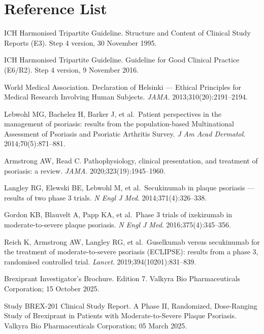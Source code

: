 \section{Reference List}

\begin{enumerate}[label={[\arabic*]}, leftmargin=*]
  \item ICH Harmonised Tripartite Guideline. Structure and Content of Clinical Study Reports (E3). Step 4 version, 30 November 1995.
  \item ICH Harmonised Tripartite Guideline. Guideline for Good Clinical Practice (E6/R2). Step 4 version, 9 November 2016.
  \item World Medical Association. Declaration of Helsinki --- Ethical Principles for Medical Research Involving Human Subjects. \textit{JAMA}. 2013;310(20):2191--2194.
  \item Lebwohl MG, Bachelez H, Barker J, et al.\ Patient perspectives in the management of psoriasis: results from the population-based Multinational Assessment of Psoriasis and Psoriatic Arthritis Survey. \textit{J Am Acad Dermatol}. 2014;70(5):871--881.
  \item Armstrong AW, Read C. Pathophysiology, clinical presentation, and treatment of psoriasis: a review. \textit{JAMA}. 2020;323(19):1945--1960.
  \item Langley RG, Elewski BE, Lebwohl M, et al.\ Secukinumab in plaque psoriasis --- results of two phase 3 trials. \textit{N Engl J Med}. 2014;371(4):326--338.
  \item Gordon KB, Blauvelt A, Papp KA, et al.\ Phase 3 trials of ixekizumab in moderate-to-severe plaque psoriasis. \textit{N Engl J Med}. 2016;375(4):345--356.
  \item Reich K, Armstrong AW, Langley RG, et al.\ Guselkumab versus secukinumab for the treatment of moderate-to-severe psoriasis (ECLIPSE): results from a phase 3, randomised controlled trial. \textit{Lancet}. 2019;394(10201):831--839.
  \item Brexiprant Investigator's Brochure. Edition 7. Valkyra Bio Pharmaceuticals Corporation; 15 October 2025.
  \item Study BREX-201 Clinical Study Report. A Phase II, Randomized, Dose-Ranging Study of Brexiprant in Patients with Moderate-to-Severe Plaque Psoriasis. Valkyra Bio Pharmaceuticals Corporation; 05 March 2025.
\end{enumerate}
